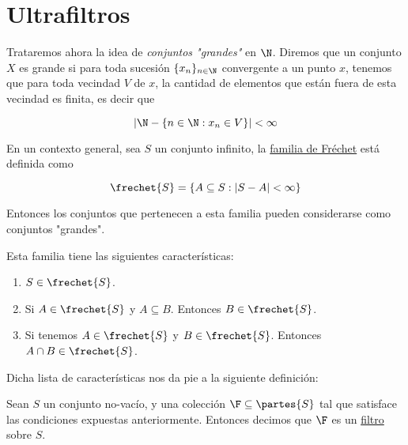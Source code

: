 \section{Ultrafiltros}

Trataremos ahora la idea de \textit{conjuntos "grandes"} en $\N$. Diremos que un conjunto $X$ es grande si para toda sucesión $\{x_n\}_{n \in \N}$ convergente a un punto $x$, tenemos que para toda vecindad $V$ de $x$, la cantidad de elementos que están fuera de esta vecindad es finita, es decir que

\[
\left| \N - \{ n \in \N : x_n \in V \} \right| < \infty
\]

En un contexto general, sea $S$ un conjunto infinito, la \ul{familia de Fréchet} está definida como

\[
\frechet{S} = \{A \subseteq S : |S - A| < \infty\}
\]

Entonces los conjuntos que pertenecen a esta familia pueden considerarse como conjuntos "grandes".

Esta familia tiene las siguientes características:

\begin{enumerate}
    \item $S \in \frechet{S}$.
    \item Si $A \in \frechet{S}$ y $A \subseteq B$. Entonces $B \in \frechet{S}$.
    \item Si tenemos $A \in \frechet{S}$ y $B \in \frechet{S}$. Entonces $A \cap B \in \frechet{S}$.
\end{enumerate}

Dicha lista de características nos da pie a la siguiente definición:

\begin{defn}
    Sean $S$ un conjunto no-vacío, y una colección $\F \subseteq \partes{S}$ tal que satisface las condiciones expuestas anteriormente. Entonces decimos que $\F$ es un \ul{filtro} sobre $S$.
\end{defn}

